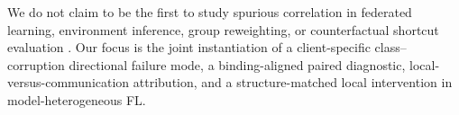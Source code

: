 We do not claim to be the first to study spurious correlation in federated learning, environment inference, group reweighting, or counterfactual shortcut evaluation \citep{wang2024pflspurious,tang2024fedpin,ma2024fedcd,creager2021eiil,sagawa2020groupdro,vigneshwaran2026counterfactual}. Our focus is the joint instantiation of a client-specific class--corruption directional failure mode, a binding-aligned paired diagnostic, local-versus-communication attribution, and a structure-matched local intervention in model-heterogeneous FL.
